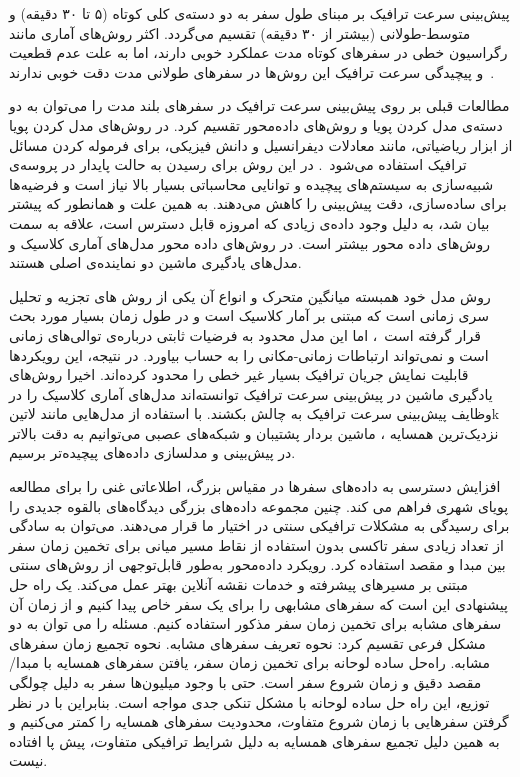 
پیش‌بینی سرعت ترافیک بر مبنای طول سفر به دو دسته‌ی کلی کوتاه (۵ تا ۳۰ دقیقه) و متوسط-طولانی (بیشتر از ۳۰ دقیقه) تقسیم می‌گردد.
اکثر روش‌های آماری مانند رگراسیون خطی در سفرهای کوتاه مدت عملکرد خوبی دارند، اما به علت عدم قطعیت و پیچیدگی سرعت ترافیک این روش‌ها در سفرهای طولانی مدت دقت خوبی ندارند~.

مطالعات قبلی بر روی پیش‌بینی سرعت ترافیک در سفرهای بلند مدت را می‌توان به دو دسته‌ی مدل کردن پویا و روش‌های داده‌محور تقسیم کرد.
در روش‌های مدل کردن پویا از ابزار ریاضیاتی، مانند معادلات دیفرانسیل و دانش فیزیکی، برای فرموله کردن مسائل ترافیک استفاده می‌شود~.
در این روش برای رسیدن به حالت پایدار در پروسه‌ی شبیه‌سازی به سیستم‌های پیچیده و توانایی محاسباتی بسیار بالا نیاز است و فرضیه‌ها برای ساده‌سازی، دقت پیش‌بینی را کاهش می‌دهند.
به همین علت و همانطور که پیشتر بیان شد، به دلیل وجود داده‌ی زیادی که امروزه قابل دسترس است، علاقه به سمت روش‌های داده محور بیشتر است.
در روش‌های داده محور مدل‌های آماری کلاسیک و مدل‌های یادگیری ماشین دو نماینده‌ی اصلی هستند.

روش مدل خود همبسته میانگین متحرک و انواع آن یکی از روش های تجزیه و تحلیل سری زمانی است که مبتنی بر آمار کلاسیک است
و در طول زمان بسیار مورد بحث قرار گرفته است~،
اما این مدل محدود به فرضیات ثابتی درباره‌ی توالی‌های زمانی است و نمی‌تواند ارتباطات زمانی-مکانی را به حساب بیاورد. در نتیجه، این رویکردها قابلیت نمایش جریان ترافیک بسیار غیر خطی را محدود کرده‌اند.
اخیرا روش‌های یادگیری ماشین در پیش‌بینی سرعت ترافیک توانسته‌اند مدل‌های آماری کلاسیک را در وظایف پیش‌بینی سرعت ترافیک به چالش بکشند. با استفاده از مدل‌هایی مانند ‌لاتین{k} نزدیک‌ترین همسایه ، ماشین بردار پشتیبان  و شبکه‌های عصبی  می‌توانیم به دقت بالاتر در پیش‌بینی و مدلسازی داده‌های پیچیده‌تر برسیم.


افزایش دسترسی به داده‌های سفرها در مقیاس بزرگ، اطلاعاتی غنی را برای مطالعه پویای شهری فراهم می کند.
چنین مجموعه داده‌های بزرگی دیدگاه‌های بالقوه جدیدی را برای رسیدگی به مشکلات ترافیکی سنتی در اختیار ما قرار می‌دهند.
می‌توان به سادگی از تعداد زیادی سفر تاکسی بدون استفاده از نقاط مسیر میانی برای تخمین زمان سفر بین مبدا و مقصد استفاده کرد.
رویکرد داده‌محور به‌طور قابل‌توجهی از روش‌های سنتی مبتنی بر مسیرهای پیشرفته و خدمات نقشه آنلاین بهتر عمل می‌کند.
یک راه حل پیشنهادی این است که سفرهای مشابهی را برای یک سفر خاص پیدا کنیم و از زمان آن سفرهای مشابه برای تخمین زمان سفر مذکور استفاده کنیم.
مسئله را می توان به دو مشکل فرعی تقسیم کرد:
 نحوه تعریف سفرهای مشابه.
 نحوه تجمیع زمان سفرهای مشابه.
راه‌حل ساده لوحانه برای تخمین زمان سفر، یافتن سفرهای همسایه با مبدا/مقصد دقیق و زمان شروع سفر است.
حتی با وجود میلیون‌ها سفر به دلیل چولگی توزیع، این راه حل ساده لوحانه با مشکل تنکی جدی مواجه است.
بنابراین با در نظر گرفتن سفرهایی با زمان شروع متفاوت، محدودیت سفرهای همسایه را کمتر می‌کنیم
و به همین دلیل تجمیع سفرهای همسایه به دلیل شرایط ترافیکی متفاوت، پیش پا افتاده نیست. 


